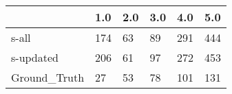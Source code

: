 \begin{tabular}{llllll}
\toprule
{} &  1.0 & 2.0 & 3.0 &  4.0 &  5.0 \\
\midrule
s-all        &  174 &  63 &  89 &  291 &  444 \\
s-updated    &  206 &  61 &  97 &  272 &  453 \\
Ground\_Truth &   27 &  53 &  78 &  101 &  131 \\
\bottomrule
\end{tabular}
